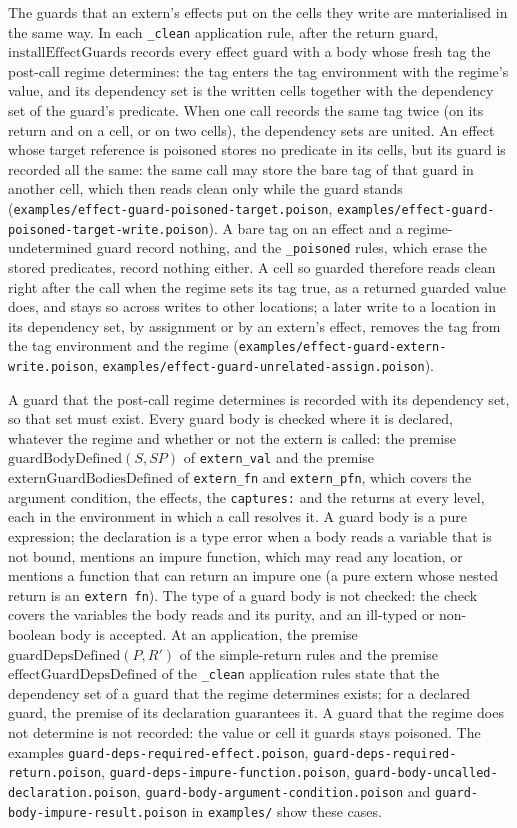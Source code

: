 \documentclass[12pt]{article}
\begin{document}
The guards that an extern's effects put on the cells they write are
materialised in the same way. In each \texttt{\_clean} application rule,
after the return guard, \(\mathrm{installEffectGuards}\) records every
effect guard with a body whose fresh tag the post-call regime determines: the
tag enters the tag environment with the regime's value, and its dependency set
is the written cells together with the dependency set of the guard's
predicate. When one call records
the same tag twice (on its return and on a cell, or on two cells), the
dependency sets are united. An effect whose target reference is poisoned
stores no predicate in its cells, but its guard is recorded all the same: the
same call may store the bare tag of that guard in another cell, which then
reads clean only while the guard stands
(\texttt{examples/effect-guard-poisoned-target.poison},
\texttt{examples/effect-guard-poisoned-target-write.poison}). A bare tag on an
effect and a regime-undetermined guard record nothing, and the
\texttt{\_poisoned} rules, which erase the stored predicates, record nothing
either. A cell so guarded therefore reads
clean right after the call when the regime sets its tag true, as a returned
guarded value does, and stays so across writes to other locations; a later
write to a location in its dependency set, by assignment or by an extern's
effect, removes the tag from the tag environment and the regime
(\texttt{examples/effect-guard-extern-write.poison},
\texttt{examples/effect-guard-unrelated-assign.poison}).

A guard that the post-call regime determines is recorded with its dependency
set, so that set must exist. Every guard body is checked where it is declared,
whatever the regime and whether or not the extern is called: the premise
\(\mathrm{guardBodyDefined}(S, SP)\) of \texttt{extern\_val} and the premise
\(\mathrm{externGuardBodiesDefined}\) of \texttt{extern\_fn} and
\texttt{extern\_pfn}, which covers the argument condition, the effects, the
\texttt{captures:} and the returns at every level, each in the environment in
which a call resolves it. A guard body is a pure expression; the declaration is
a type error when a body reads a variable that is not bound, mentions an
impure function, which may read any location, or mentions a function that can
return an impure one (a pure extern whose nested return is an \texttt{extern
fn}). The type of a guard body is not checked: the check covers the variables
the body reads and its purity, and an ill-typed or non-boolean body is
accepted. At an application, the premise \(\mathrm{guardDepsDefined}(P, R')\)
of the simple-return rules and the premise
\(\mathrm{effectGuardDepsDefined}\) of the \texttt{\_clean} application rules
state that the dependency set of a guard that the regime determines exists;
for a declared guard, the premise of its declaration guarantees it. A guard
that the regime does not determine is not recorded: the value or cell it
guards stays poisoned.
The examples \texttt{guard-deps-required-effect.poison},
\texttt{guard-deps-required-return.poison},
\texttt{guard-deps-impure-function.poison},
\texttt{guard-body-uncalled-declaration.poison},
\texttt{guard-body-argument-condition.poison} and
\texttt{guard-body-impure-result.poison} in \texttt{examples/} show these
cases.
\end{document}
